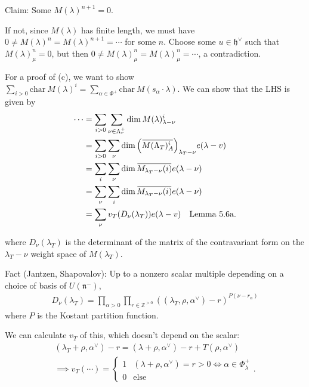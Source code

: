 \documentclass[11pt]{scrartcl}
\theoremstyle{definition}
\theoremstyle{theorem}
\theoremstyle{proof}
\newenvironment{proof}
{\pushQED{$\qed$}\pf}
{\par\popQED\endpf}
\theoremstyle{definition}
\theoremstyle{break}
\theoremstyle{problem}
\DeclarePairedDelimiter\qty{(}{)}
\renewcommand{\qty}[1]{{\left(  {#1} \right)}}
\newcommand{\ZZ}[0]{{\mathbb{Z}}}
\newcommand{\ch}[0]{\mathrm{char}~}
\newcommand{\dual}[0]{^\vee}
\newcommand{\lieh}[0]{{\mathfrak{h}}}
\newcommand{\lien}[0]{{\mathfrak{n}}}
\renewcommand{\bar}[1]{\mkern 1.5mu\overline{\mkern-1.5mu#1\mkern-1.5mu}\mkern 1.5mu}
\renewcommand{\qed}[0]{\hfill\blacksquare}
\begin{document}
Claim: Some \(M(\lambda)^{n+1} = 0\).

\begin{proof}

If not, since \(M(\lambda)\) has finite length, we must have
\(0 \neq M(\lambda)^n = M(\lambda)^{n+1} = \cdots\) for some \(n\).
Choose some \(u\in \lieh\dual\) such that \(M(\lambda)_\mu^n = 0\), but
then \(0 \neq M(\lambda)_\mu^n = M(\lambda)_\mu^n = \cdots\), a
contradiction.\end{proof}

For a proof of (c), we want to show
\(\sum_{i > 0} \ch M(\lambda)^i = \sum_{\alpha \in \Phi^+} \ch M(s_\alpha \cdot \lambda)\).
We can show that the LHS is given by \begin{align*}
\cdots
&= \sum_{i > 0} \sum_{\nu \in \Lambda_r^+} \dim M(\lambda)_{\lambda-\nu}^i \\
&= \sum_{i > 0} \sum_\nu \dim\qty{\bar{M(\Lambda_T)_A^i}}_{\lambda_T - \nu} e(\lambda - v) \\
&= \sum_i \sum_\nu \dim \bar{M_{\lambda_T -\nu}(i)} e(\lambda - \nu) \\
&= \sum_\nu \sum_i \dim \bar{M_{\lambda_T -\nu}(i)} e(\lambda - \nu) \\
&= \sum_\nu v_T(D_\nu(\lambda_T)) e(\lambda - v) \quad\text{Lemma 5.6a}
.\end{align*}

where \(D_\nu(\lambda_T)\) is the determinant of the matrix of the
contravariant form on the \(\lambda_T - \nu\) weight space of
\(M(\lambda_T)\).

Fact (Jantzen, Shapovalov): Up to a nonzero scalar multiple depending on
a choice of basis of \(U(\lien^-)\), \begin{align*}
D_\nu(\lambda_T) = \prod_{\alpha > 0} \prod_{r \in \ZZ^{>0}} \qty{ (\lambda_T, \rho, \alpha\dual) - r  }^{P(\nu - r_\alpha)}
\end{align*} where \(P\) is the Kostant partition function.

We can calculate \(v_T\) of this, which doesn't depend on the scalar:
\begin{align*}
(\lambda_T + \rho, \alpha\dual) - r = (\lambda+\rho, \alpha\dual) -r + T(\rho, \alpha\dual)\\
\implies v_T( \cdots ) =
\begin{cases}
1 & (\lambda + \rho, \alpha\dual) = r > 0 \iff \alpha \in \Phi_\lambda^+ \\
0 & \text{else}
\end{cases}
.\end{align*}
\end{document}
